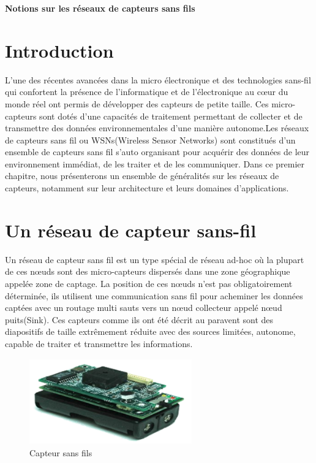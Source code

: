 

\cleardoublepage


\setcounter{chapter}{1}



\begin{center}
	\Huge\textbf{Notions sur les réseaux de capteurs sans fils}
\end{center}

\section{Introduction}
L’une des récentes avancées dans la micro électronique et des technologies sans-fil qui confortent la présence de l’informatique et de l’électronique au cœur du monde réel ont permis de développer des capteurs de petite taille. Ces  micro-capteurs sont dotés d’une capacités de traitement permettant de collecter et de transmettre des données environnementales d'une manière autonome.Les réseaux de capteurs sans fil ou WSNs(Wireless Sensor Networks) sont constitués d’un ensemble de capteurs sans fil s’auto organisant pour acquérir des données de leur environnement immédiat, de les traiter et de les communiquer.
Dans ce premier chapitre, nous présenterons un ensemble de généralités sur les réseaux de capteurs, notamment sur leur architecture et leurs domaines d’applications.\\

\section{Un réseau de capteur sans-fil}
Un réseau de capteur sans fil est un type spécial de réseau ad-hoc où la plupart de ces nœuds sont des micro-capteurs dispersés dans une zone géographique appelée zone de captage. La position de ces nœuds n’est pas obligatoirement déterminée, ils utilisent une communication sans fil pour acheminer les données captées avec un routage multi sauts vers un nœud collecteur appelé nœud puits(Sink). Ces capteurs comme ils ont été décrit au paravent  sont des diapositifs de taille extrêmement réduite avec des sources limitées, autonome, capable de traiter et transmettre les informations.\\
\begin{figure}[H]
	\centering
	\includegraphics[width=7cm,height=3.7cm]{Chap1/1.png}
	\caption{Capteur sans fils}
	\label{fig:CSF}
\end{figure}

